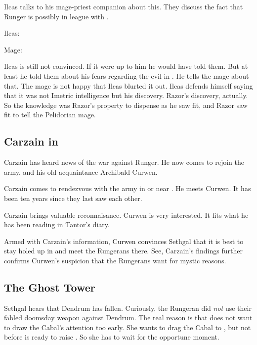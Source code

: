 Ilcas talks to his mage-priest companion about this. 
They discuss the fact that Runger is possibly in league with \Durcac. 

\begin{prose}
  Ilcas: 
  
  Mage: 
\end{prose}

Ilcas is still not convinced. 
If it were up to him he would have told them. 
But at least he told them about his fears regarding the evil in \Malcur. 
He tells the mage about that. 
The mage is not happy that Ilcas blurted it out. 
Ilcas defends himself saying that it was not Imetric intelligence but his discovery. 
Razor's discovery, actually. 
So the knowledge was Razor's property to dispense as he saw fit, and Razor saw fit to tell the Pelidorian mage. 









\subsection{Carzain in \Forclin}
Carzain \Shireyo{} has heard news of the war against Runger. 
He now comes to rejoin the army, and his old acquaintance Archibald Curwen. 

Carzain comes to rendezvous with the army in or near \Forclin. 
He meets Curwen. 
It has been ten years since they last saw each other. 

Carzain brings valuable reconnaisance. 
Curwen is very interested. 
It fits what he has been reading in Tantor's diary. 

Armed with Carzain's information, Curwen convinces Sethgal that it is best to stay holed up in \Forclin{} and meet the Rungerans there. 
See, Carzain's findings further confirms Curwen's suspicion that the Rungerans want \Forclin{} for mystic reasons. 









\subsection{The Ghost Tower}
Sethgal hears that Dendrum has fallen.
Curiously, the Rungeran \ishrah did \emph{not} use their fabled doomsday weapon against Dendrum. 
The real reason is that \Takestsha does not want to draw the Cabal's attention too early.
She wants to drag the Cabal to \Forclin, but not before \Psyrex is ready to raise \Nithdornazsh.
So she has to wait for the opportune moment. 

